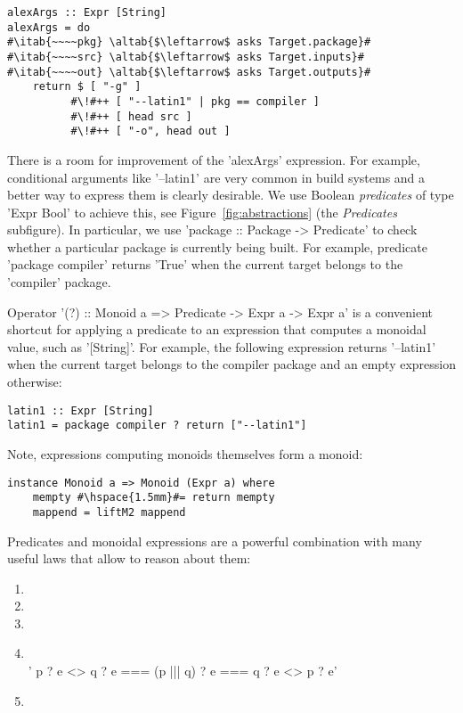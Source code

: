 \begin{lstlisting}
alexArgs :: Expr [String]
alexArgs = do
#\itab{~~~~pkg} \altab{$\leftarrow$ asks Target.package}#
#\itab{~~~~src} \altab{$\leftarrow$ asks Target.inputs}#
#\itab{~~~~out} \altab{$\leftarrow$ asks Target.outputs}#
    return $ [ "-g" ]
          #\!#++ [ "--latin1" | pkg == compiler ]
          #\!#++ [ head src ]
          #\!#++ [ "-o", head out ]
\end{lstlisting}

There is a room for improvement of the \lst'alexArgs' expression. For
example, conditional arguments like \lst'--latin1' are very common in build
systems and a better way to express them is clearly desirable. We use Boolean
\emph{predicates} of type \lst'Expr Bool' to achieve this, see
Figure~\ref{fig:abstractions} (the \emph{Predicates} subfigure). In particular, we
use \lst'package :: Package -> Predicate' to check whether a particular package
is currently being built. For example, predicate \lst'package compiler'
returns \lst'True' when the current target belongs to the \lst'compiler'
package.

Operator \lst'(?) :: Monoid a => Predicate -> Expr a -> Expr a' is a
convenient shortcut for applying a predicate to an expression that computes a monoidal value, such
as \lst'[String]'. For example, the following expression returns
\lst'--latin1' when the current target belongs to the compiler package and an
empty expression otherwise:

\begin{lstlisting}
latin1 :: Expr [String]
latin1 = package compiler ? return ["--latin1"]
\end{lstlisting}

\noindent Note, expressions computing monoids themselves form a monoid:

\begin{lstlisting}
instance Monoid a => Monoid (Expr a) where
    mempty #\hspace{1.5mm}#= return mempty
    mappend = liftM2 mappend
\end{lstlisting}

Predicates and monoidal expressions are a powerful combination with many useful
laws that allow to reason about them:
\begin{enumerate}
  \item {} 
  \item {} 
  \item {} 
  \item {}  \vspace{1mm}\\
  \lst'    p ? e <> q ? e === (p ||| q) ? e === q ? e <> p ? e'
  \item {} 
\end{enumerate}

